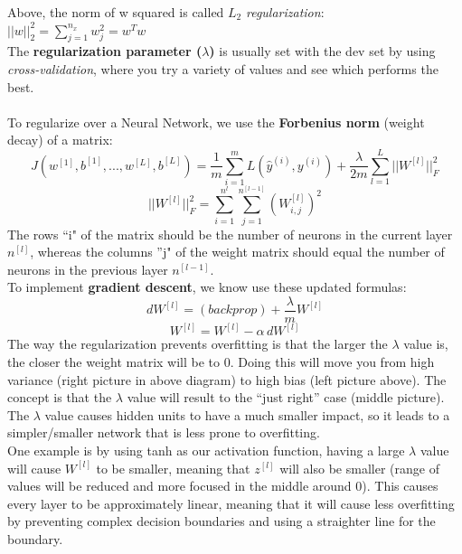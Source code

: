 \documentclass[11pt, a4paper]{article}
\begin{document}
\begin{spacing}{1.1}
	\noindent Above, the norm of w squared is called $L_2$ \textit{regularization}: $||w||^2_2 = \sum_{j=1}^{n_x} w^2_j = w^Tw$ \vspace*{1.5mm} \\
	The \textbf{regularization parameter ($\lambda$)} is usually set with the dev set by using \textit{cross-validation}, where you try a variety of values and see which performs the best. \\~\\
	To regularize over a Neural Network, we use the \textbf{Forbenius norm} (weight decay) of a matrix:
	$$ J(w^{[1]}, b^{[1]}, ..., w^{[L]}, b^{[L]}) = \frac{1}{m} \sum_{i=1}^{m} L(\hat{y}^{(i)}, y^{(i)}) + \frac{\lambda}{2m} \sum_{l=1}^{L} ||W^{[l]}||^2_F$$ $$ ||W^{[l]}||^2_F = \sum_{i=1}^{n^l}\sum_{j=1}^{n^{[l-1]}} (W^{[l]}_{i,j})^2$$ 
	The rows ``i" of the matrix should be the number of neurons in the current layer $n^{[l]}$, whereas the columns ''j" of the weight matrix should equal the number of neurons in the previous layer $n^{[l-1]}$. \vspace*{1mm} \\
	To implement \textbf{gradient descent}, we know use these updated formulas: 
	$$ dW^{[l]} = (backprop) + \frac{\lambda}{m}W^{[l]} $$
	$$ W^{[l]} = W^{[l]} - \alpha\, dW^{[l]} $$
	The way the regularization prevents overfitting is that the larger the $\lambda$ value is, the closer the weight matrix will be to 0. Doing this will move you from high variance (right picture in above diagram) to high bias (left picture above). The concept is that the $\lambda$ value will result to the ``just right'' case (middle picture). The $\lambda$ value causes hidden units to have a much smaller impact, so it leads to a simpler/smaller network that is less prone to overfitting. \vspace*{1mm} \\
	One example is by using tanh as our activation function, having a large $\lambda$ value will cause $W^{[l]}$ to be smaller, meaning that $z^{[l]}$ will also be smaller (range of values will be reduced and more focused in the middle around 0). This causes every layer to be approximately linear, meaning that it will cause less overfitting by preventing complex decision boundaries and using a straighter line for the boundary. 

\end{spacing}
\end{document}
